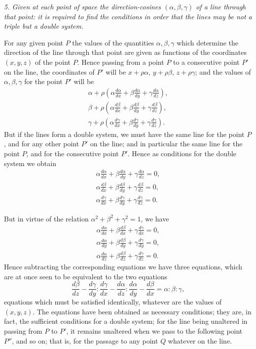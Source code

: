 \documentclass[11pt,a4paper]{article}
\theoremstyle{plain}
\theoremstyle{definition}
\newcommand{\diff}[2]{\frac{d#1}{d#2}}
\begin{document}
\medskip
\noindent\textit{5. Given at each point of space the direction-cosines $(\alpha,\beta,\gamma)$ of a line through that point: it is required to find the conditions in order that the lines may be not a triple but a double system.}

For any given point $P$ the values of the quantities $\alpha,\beta,\gamma$ which determine the direction of the line through that point are given as functions of the coordinates $(x,y,z)$ of the point $P$. Hence passing from a point $P$ to a consecutive point $P'$ on the line, the coordinates of $P'$ will be $x+\rho\alpha$, $y+\rho\beta$, $z+\rho\gamma$; and the values of $\alpha,\beta,\gamma$ for the point $P'$ will be
\[
\begin{gathered}
\alpha+\rho\left(\alpha\diff{\alpha}{x}+\beta\diff{\alpha}{y}+\gamma\diff{\alpha}{z}\right),\\
\beta+\rho\left(\alpha\diff{\beta}{x}+\beta\diff{\beta}{y}+\gamma\diff{\beta}{z}\right),\\
\gamma+\rho\left(\alpha\diff{\gamma}{x}+\beta\diff{\gamma}{y}+\gamma\diff{\gamma}{z}\right).
\end{gathered}
\]
But if the lines form a double system, we must have the same line for the point $P$, and for any other point $P'$ on the line; and in particular the same line for the point $P$, and for the consecutive point $P'$. Hence as conditions for the double system we obtain
\[
\begin{gathered}
\alpha\diff{\alpha}{x}+\beta\diff{\alpha}{y}+\gamma\diff{\alpha}{z}=0,\\
\alpha\diff{\beta}{x}+\beta\diff{\beta}{y}+\gamma\diff{\beta}{z}=0,\\
\alpha\diff{\gamma}{x}+\beta\diff{\gamma}{y}+\gamma\diff{\gamma}{z}=0.
\end{gathered}
\]

\newpage

But in virtue of the relation $\alpha^2+\beta^2+\gamma^2=1$, we have
\[
\begin{gathered}
\alpha\diff{\alpha}{x}+\beta\diff{\beta}{x}+\gamma\diff{\gamma}{x}=0,\\
\alpha\diff{\alpha}{y}+\beta\diff{\beta}{y}+\gamma\diff{\gamma}{y}=0,\\
\alpha\diff{\alpha}{z}+\beta\diff{\beta}{z}+\gamma\diff{\gamma}{z}=0.
\end{gathered}
\]
Hence subtracting the corresponding equations we have three equations, which are at once seen to be equivalent to the two equations
\[
\diff{\beta}{z}-\diff{\gamma}{y}:\diff{\gamma}{x}-\diff{\alpha}{z}:\diff{\alpha}{y}-\diff{\beta}{x}
=\alpha:\beta:\gamma,
\]
equations which must be satisfied identically, whatever are the values of $(x,y,z)$. The equations have been obtained as necessary conditions; they are, in fact, the sufficient conditions for a double system; for the line being unaltered in passing from $P$ to $P'$, it remains unaltered when we pass to the following point $P''$, and so on; that is, for the passage to any point $Q$ whatever on the line.
\end{document}
